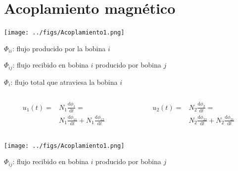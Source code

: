 \documentclass[xcolor={usenames,svgnames,dvipsnames}]{beamer}
\begin{document}
\section{Acoplamiento magnético}
\label{sec:org2bd5032}
\begin{frame}[label={sec:org8c40340},plain]{}
\begin{center}
\texttt{[image: ../figs/Acoplamiento1.png]}
\end{center}

\(\Phi_{ii}\): flujo producido por la bobina \(i\)

\(\Phi_{ij}\): flujo recibido en bobina \(i\) producido por bobina \(j\)

\(\Phi_{i}\): flujo total que atraviesa la bobina \(i\)
\end{frame}
\begin{frame}[label={sec:orgcc0b447},plain]{}
\begin{columns}
\begin{column}{0.5\columnwidth}
\begin{align*}
  u_1(t) = &N_1 \frac{\mathrm{d}\phi_1}{\mathrm{d}t} = \\
  &N_1 \frac{\mathrm{d}\phi_{11}}{\mathrm{d}t} + N_1 \frac{\mathrm{d}\phi_{12}}{\mathrm{d}t}
\end{align*}
\end{column}

\begin{column}{0.5\columnwidth}
\begin{align*}
  u_2(t) = &N_2 \frac{\mathrm{d}\phi_2}{\mathrm{d}t} = \\
  &N_2 \frac{\mathrm{d}\phi_{22}}{\mathrm{d}t} + N_2 \frac{\mathrm{d}\phi_{21}}{\mathrm{d}t}
\end{align*}
\end{column}
\end{columns}

\begin{center}
\texttt{[image: ../figs/Acoplamiento1.png]}
\end{center}

\begin{center}
\(\Phi_{ij}\): flujo recibido en bobina \(i\) producido por bobina \(j\)
\end{center}
\end{frame}
\end{document}
